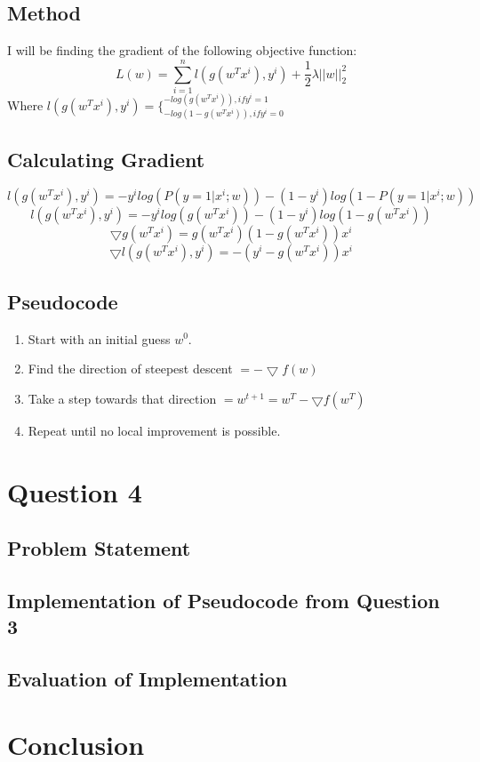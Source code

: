 \documentclass[letterpaper,10pt]{article}
\begin{document}
\subsection{Method}
I will be finding the gradient of the following objective function:
\[L(w) = \sum_{i=1}^n l(g(w^T x^i), y^i) + \frac{1}{2} \lambda ||w||_2^2  \]
Where \(l(g(w^T x^i), y^i) = \{^{-log(g(w^T x^i)), if y^i = 1}_{-log(1-g(w^T x^i)), if y^i = 0} \)

\subsection{Calculating Gradient}
\[ l(g(w^T x^i), y^i) = -y^i log(P(y=1 | x^i; w)) - (1-y^i) log(1-P(y=1 | x^i; w)) \]
\[ l(g(w^T x^i), y^i) = -y^i log(g(w^T x^i)) - (1-y^i) log(1 - g(w^T x^i)) \]
\[ \bigtriangledown g(w^T x^i) = g(w^T x^i) (1 - g(w^T x^i)) x^i \]
\[ \bigtriangledown l(g(w^T x^i), y^i) = -(y^i - g(w^T x^i)) x^i \]

\subsection{Pseudocode}
\begin{enumerate}
	\item{Start with an initial guess \(w^0\).}
	\item{Find the direction of steepest descent \(= - \bigtriangledown f(w) \)}
	\item{Take a step towards that direction \( = w^{t+1} = w^T - \bigtriangledown f(w^T) \)}
	\item{Repeat until no local improvement is possible.}
\end{enumerate}

\section{Question 4}
\subsection{Problem Statement}

\subsection{Implementation of Pseudocode from Question 3}
\subsection{Evaluation of Implementation}

\section{Conclusion}
\end{document}
